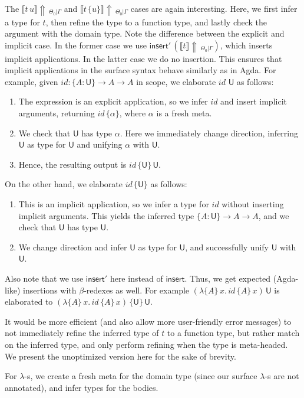 \documentclass[acmsmall,screen,dvipsnames]{acmart}\settopmatter{}
\renewcommand{\U}{\mathsf{U}}
\newcommand{\mi}[1]{\mathit{#1}}
\newcommand{\einfer}[3]{\llbracket#1\rrbracket\!\Uparrow\,_{#2|#3}}
\newcommand{\einsert}{\mathsf{insert}}
\theoremstyle{remark}
\begin{document}
The $\einfer{t\,u}{\Theta_0}{\Gamma}$ and $\einfer{t\,\{u\}}{\Theta_0}{\Gamma}$
cases are again interesting. Here, we first infer a type for $t$, then refine
the type to a function type, and lastly check the argument with the domain
type. Note the difference between the explicit and implicit case. In the former
case we use $\einsert'\,(\einfer{t}{\Theta_0}{\Gamma})$, which inserts implicit
applications. In the latter case we do no insertion. This ensures that implicit
applications in the surface syntax behave similarly as in Agda. For example,
given $\mi{id} : \{A : \U\}\to A\to A$ in scope, we elaborate $\mi{id}\,\,\U$ as follows:
\begin{enumerate}
  \item The expression is an explicit application, so we infer $\mi{id}$ and insert implicit
        arguments, returning $\mi{id}\,\{\alpha\}$, where $\alpha$ is a fresh meta.
  \item We check that $\U$ has type $\alpha$. Here we immediately change direction,
        inferring $\U$ as type for $\U$ and unifying $\alpha$ with $\U$.
  \item Hence, the resulting output is $\mi{id}\,\{\U\}\,\U$.
\end{enumerate}
On the other hand, we elaborate $\mi{id}\,\{\U\}$ as follows:
\begin{enumerate}
  \item This is an implicit application, so we infer a type for $\mi{id}$ without inserting
    implicit arguments. This yields the inferred type $\{A : \U\}\to A\to A$, and
    we check that $\U$ has type $\U$.
  \item We change direction and infer $\U$ as type for $\U$, and successfully
    unify $\U$ with $\U$.
\end{enumerate}
Also note that we use $\einsert'$ here instead of $\einsert$. Thus, we get
expected (Agda-like) insertions with $\beta$-redexes as well. For example
$(\lambda\{A\}\,x.\, \mi{id}\,\{A\}\,x)\,\U$ is elaborated to
$(\lambda\{A\}\,x.\, \mi{id}\,\{A\}\,x)\,\{\U\}\,\U$.

It would be more efficient (and also allow more user-friendly error
messages) to not immediately refine the inferred type of $t$ to a function type,
but rather match on the inferred type, and only perform refining when the type
is meta-headed. We present the unoptimized version here for the sake of brevity.

For $\lambda$-s, we create a fresh meta for the domain type (since our surface
$\lambda$-s are not annotated), and infer types for the bodies.
\end{document}
